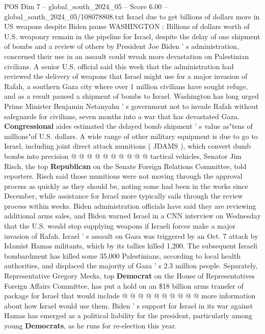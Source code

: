 \begin{textsample}{POS Dim 7 – global\_south\_2024\_05 – Score 6.00 – global\_south\_2024\_05/108078808.txt}  \label{ex:f7_pos_215}
Israel due to get billions of dollars more in US weapons despite Biden pause WASHINGTON : Billions of dollars worth of U.S. weaponry remain in the pipeline for Israel, despite the delay of one shipment of bombs and a review of others by President Joe Biden ' s administration, concerned their use in an assault could wreak more devastation on Palestinian civilians.
A senior U.S. official said this week that the administration had reviewed the delivery of weapons that Israel might use for a major invasion of Rafah, a southern Gaza city where over 1 million civilians have sought refuge, and as a result paused a shipment of bombs to Israel.
Washington has long urged Prime Minister Benjamin Netanyahu ' s government not to invade Rafah without safeguards for civilians, seven months into a war that has devastated Gaza. \textbf{Congressional} aides estimated the delayed bomb shipment ' s value as"tens of millions"of U.S. dollars.
A wide range of other military equipment is due to go to Israel, including joint direct attack munitions ( JDAMS ), which convert dumb bombs into precision @ @ @ @ @ @ @ @ @ @ tactical vehicles, Senator Jim Risch, the top \textbf{Republican} on the Senate Foreign Relations Committee, told reporters.
Risch said those munitions were not moving through the approval process as quickly as they should be, noting some had been in the works since December, while assistance for Israel more typically sails through the review process within weeks.
Biden administration officials have said they are reviewing additional arms sales, and Biden warned Israel in a CNN interview on Wednesday that the U.S. would stop supplying weapons if Israeli forces make a major invasion of Rafah.
Israel ' s assault on Gaza was triggered by an Oct. 7 attack by Islamist Hamas militants, which by its tallies killed 1,200.
The subsequent Israeli bombardment has killed some 35,000 Palestinians, according to local health authorities, and displaced the majority of Gaza ' s 2.3 million people.
Separately, Representative Gregory Meeks, top \textbf{Democrat} on the House of Representatives Foreign Affairs Committee, has put a hold on an \$18 billion arms transfer of package for Israel that would include @ @ @ @ @ @ @ @ @ @ more information about how Israel would use them.
Biden ' s support for Israel in its war against Hamas has emerged as a political liability for the president, particularly among young \textbf{Democrats}, as he runs for re-election this year.

\end{textsample}
